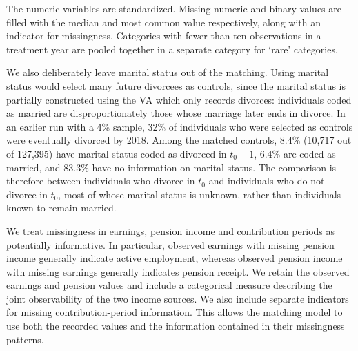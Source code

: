 \documentclass[a4paper,12pt]{article}
\theoremstyle{plain}
\theoremstyle{definition}
\theoremstyle{TheoremNum}
\theoremstyle{CorollaryNum}
\theoremstyle{PropositionNum}
\theoremstyle{TheoremNum}
\begin{document}
The numeric variables are standardized. Missing numeric and binary values are filled with the median and most common value respectively, along with an indicator for missingness. Categories with fewer than ten observations in a treatment year are pooled together in a separate category for `rare' categories.

We also deliberately leave marital status out of the matching. Using marital status would select many future divorcees as controls, since the marital status is partially constructed using the VA which only records divorces: individuals coded as married are disproportionately those whose marriage later ends in divorce. In an earlier run with a 4\% sample, 32\% of individuals who were selected as controls were eventually divorced by 2018. Among the matched controls, 8.4\% (10,717 out of 127,395) have marital status coded as divorced in $t_0-1$, 6.4\% are coded as married, and 83.3\% have no information on marital status. The comparison is therefore between individuals who divorce in $t_0$ and individuals who do not divorce in $t_0$, most of whose marital status is unknown, rather than individuals known to remain married.

We treat missingness in earnings, pension income and contribution periods as potentially informative. In particular, observed earnings with missing pension income generally indicate active employment, whereas observed pension income with missing earnings generally indicates pension receipt. We retain the observed earnings and pension values and include a categorical measure describing the joint observability of the two income sources. We also include separate indicators for missing contribution-period information. This allows the matching model to use both the recorded values and the information contained in their missingness patterns.
\end{document}
